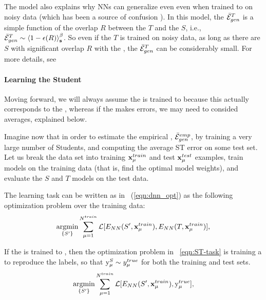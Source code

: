 The \StudentTeacher model also explains why NNs can generalize even even when trained to \Interpolation on noisy data (which has been a source of confusion \cite{Understanding16_TR}).  In this model, the \GeneralizationError  $\bar{\mathcal{E}}_{gen}^{T}$ is a simple function of the overlap $R$ between the \Teacher $T$ and the \Students $S$, i.e., $\bar{\mathcal{E}}_{gen}^{T}\sim \left\langle 1-\epsilon(R) \right\rangle_{\mathbf s}^{\beta}$.  So even if the \Teacher $T$ is trained on noisy data, as long as there are \Students $S$ with significant overlap $R$ with the \Teacher, the \Teacher \GeneralizationError  $\bar{\mathcal{E}}_{gen}^{T}$  can be considerably small.  For more details, see \cite{MM17_TR_v1}


\paragraph{Learning the Student}
Moving forward, we will always assume the \Teacher is trained to \Interpolation because this
actually corresponds to the \AnnealedApproximation, whereas if the \Teacher makes
errors, we may need to consided  \Quenched averages, explained below.

Imagine now that in order to estimate the empirical \AverageGeneralizationError, $\bar{\mathcal{E}}^{emp}_{gen}$,
by training a very large number of Students, and computing the average ST error on some test set.
Let us break the data set into training $\mathbf{x}_{\mu}^{train}$ and test $\mathbf{x}_{\mu}^{test}$ examples, 
train models on the training data (that is, find the optimal model weights), 
and evaluate the $S$ and $T$ models on the test data.

The \Student learning task can be written as in \EQN~(\ref{eqn:dnn_opt})
as the following optimization problem over the training data:
\begin{align}
\underset{\{S'\}}{\text{argmin}}\sum_{\mu=1}^{N^{train}}\mathcal{L}[E_{NN}(S',\mathbf{x}_{\mu}^{train}),E_{NN}(T,\mathbf{x}_{\mu}^{train})]   ,
\label{eqn:ST-learning-task}
\end{align}

If the \Teacher is trained to \Interpolation, then the optimization problem in \EQN~\ref{eqn:ST-task} is
training a \Student to reproduce the \GroundTruth labels, so that $\mathrm{y}_{\mu}^{S}\sim y_{\mu}^{true}$
for both the training and test sets.
\begin{align}
\underset{\{S'\}}{\text{argmin}}\sum_{\mu=1}^{N^{train}}\mathcal{L}[E_{NN}(S',\mathbf{x}_{\mu}^{train}),\mathrm{y}_{\mu}^{true}]   ,
\label{eqn:ST-learning-intepolation}
\end{align}

